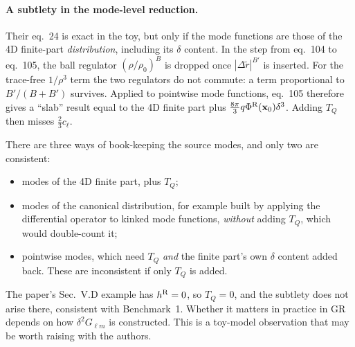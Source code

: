 \documentclass[11pt,a4paper]{article}
\newcommand{\PhiR}{\Phi^{\rm R}}
\newcommand{\x}{\mathbf{x}}
\begin{document}
\paragraph{A subtlety in the mode-level reduction.}
Their eq.~24 is exact in the toy, but only if the mode functions are those of the 4D finite-part \emph{distribution}, including its $\delta$ content.
In the step from eq.~104 to eq.~105, the ball regulator $(\rho/\rho_0)^B$ is dropped once $|\Delta\tilde r|^{B'}$ is inserted.
For the trace-free $1/\rho^3$ term the two regulators do not commute: a term proportional to $B'/(B+B')$ survives.
Applied to pointwise mode functions, eq.~105 therefore gives a ``slab'' result equal to the 4D finite part plus $\tfrac{8\pi}{3}q\PhiR(\x_0)\delta^3$. Adding $T_Q$ then misses $\tfrac23c_\ell$.

There are three ways of book-keeping the source modes, and only two are consistent:
\begin{itemize}[nosep]
\item modes of the 4D finite part, plus $T_Q$;
\item modes of the canonical distribution, for example built by applying the differential operator to kinked mode functions, \emph{without} adding $T_Q$, which would double-count it;
\item pointwise modes, which need $T_Q$ \emph{and} the finite part's own $\delta$ content added back. These are inconsistent if only $T_Q$ is added.
\end{itemize}
The paper's Sec.~V.D example has $h^{\rm R}=0$, so $T_Q=0$, and the subtlety does not arise there, consistent with Benchmark~1.
Whether it matters in practice in GR depends on how $\delta^2G_{\ell m}$ is constructed.
This is a toy-model observation that may be worth raising with the authors.
\end{document}
